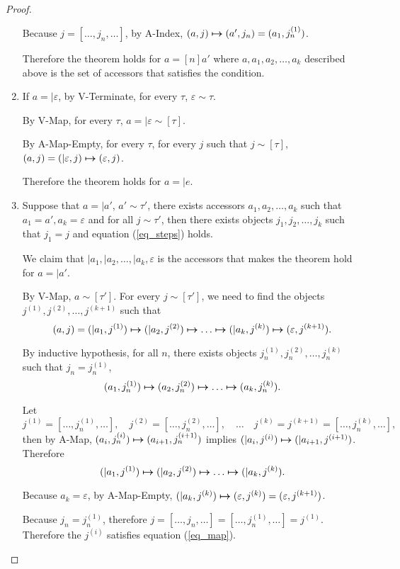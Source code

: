 \documentclass[11pt]{article}
\newcommand{\matches}[2]{{#1}\sim{#2}}   %
\begin{document}
\begin{proof}
\begin{enumerate}
          Because \(j=[\dots,j_n,\dots]\), by A-Index, \((a,j) \boldsymbol{\mapsto} (a',j_n)=(a_1,j_n^{(1)})\).

          Therefore the theorem holds for \(a=[n]a'\) where \(a, a_1, a_2, \ldots, a_k\) described above is the set of accessors that satisfies the condition.
    
    \item If \(a=|\varepsilon\), by V-Terminate, for every \(\tau\), \(\matches{\varepsilon}{\tau}\).
    
          By V-Map, for every \(\tau\), \(a=\matches{|\varepsilon}{[\tau]}\).
    
          By A-Map-Empty, for every \(\tau\), for every \(j\) such that \(\matches{j}{[\tau]}\), \((a,j)=(|\varepsilon,j) \boldsymbol{\mapsto} (\varepsilon,j)\).
    
          Therefore the theorem holds for \(a=|e\).

    \item Suppose that \(a=|a'\), \(\matches{a'}{\tau'}\), there exists accessors \(a_1, a_2, \ldots, a_k\) such that \(a_1 = a', a_k = \varepsilon\) and for all \(\matches{j}{\tau'}\), then there exists objects \(j_1, j_2, \ldots, j_k\) such that \(j_1=j\) and equation (\ref{eq_steps}) holds.
    
          We claim that \(|a_1, |a_2, \ldots, |a_k, \varepsilon\) is the accessors that makes the theorem hold for \(a=|a'\).

          By V-Map, \(\matches{a}{[\tau']}\). For every \(\matches{j}{[\tau']}\), we need to find the objects \(j^{(1)},j^{(2)},\ldots,j^{(k+1)}\) such that
          \begin{equation}\label{eq_map}
            (a,j)=(|a_1,j^{(1)}) \boldsymbol{\mapsto}(|a_2,j^{(2)}) \boldsymbol{\mapsto}\ldots\boldsymbol{\mapsto} (|a_k,j^{(k)})\boldsymbol{\mapsto} (\varepsilon,j^{(k+1)}).
          \end{equation}

          By inductive hypothesis, for all \(n\), there exists objects \(j_{n}^{(1)},j_{n}^{(2)},\ldots,j_{n}^{(k)}\) such that \(j_{n}=j_{n}^{(1)}\),
          \[(a_1,j_{n}^{(1)}) \boldsymbol{\mapsto}(a_2,j_{n}^{(2)}) \boldsymbol{\mapsto}\ldots\boldsymbol{\mapsto} (a_k,j_{n}^{(k)}).\]

          Let
          \[j^{(1)}=[\ldots,j_n^{(1)},\ldots],\quad j^{(2)}=[\ldots,j_n^{(2)},\ldots],\quad\ldots\quad j^{(k)}=j^{(k+1)}=[\ldots,j_n^{(k)},\ldots],\]
          then by A-Map, \((a_i,j_{n}^{(i)}) \boldsymbol{\mapsto} (a_{i+1},j_{n}^{(i+1)})\) implies \((|a_i,j^{(i)}) \boldsymbol{\mapsto} (|a_{i+1},j^{(i+1)})\). Therefore
          \[(|a_1,j^{(1)}) \boldsymbol{\mapsto}(|a_2,j^{(2)}) \boldsymbol{\mapsto}\ldots\boldsymbol{\mapsto} (|a_k,j^{(k)}).\]

          Because \(a_k=\varepsilon\), by A-Map-Empty, \((|a_k,j^{(k)}) \boldsymbol{\mapsto} (\varepsilon,j^{(k)})=(\varepsilon,j^{(k+1)})\).

          Because \(j_{n}=j_{n}^{(1)}\), therefore \(j=[\ldots,j_n,\ldots]=[\ldots,j_n^{(1)},\ldots]=j^{(1)}\). Therefore the \(j^{(i)}\) satisfies equation (\ref{eq_map}).\qedhere
  \end{enumerate}
\end{proof}
\end{document}
